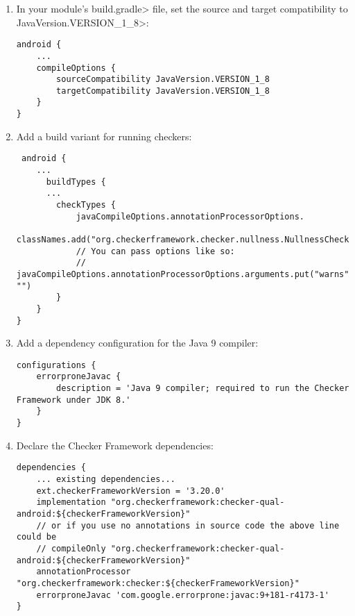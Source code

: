 \begin{enumerate}

\item In your module's \<build.gradle> file, set the source and target
  compatibility to \<JavaVersion.VERSION\_1\_8>:

\begin{Verbatim}
android {
    ...
    compileOptions {
        sourceCompatibility JavaVersion.VERSION_1_8
        targetCompatibility JavaVersion.VERSION_1_8
    }
}
\end{Verbatim}

\item Add a build variant for running checkers:

 \begin{Verbatim}
 android {
    ...
      buildTypes {
      ...
        checkTypes {
            javaCompileOptions.annotationProcessorOptions.
                    classNames.add("org.checkerframework.checker.nullness.NullnessChecker")
            // You can pass options like so:
            // javaCompileOptions.annotationProcessorOptions.arguments.put("warns", "")
        }
    }
}
\end{Verbatim}

\item Add a dependency configuration for the Java 9 compiler:

\begin{mysmall}
\begin{Verbatim}
configurations {
    errorproneJavac {
        description = 'Java 9 compiler; required to run the Checker Framework under JDK 8.'
    }
}

\end{Verbatim}
\end{mysmall}

\item Declare the Checker Framework dependencies:

\begin{mysmall}
\begin{Verbatim}
dependencies {
    ... existing dependencies...
    ext.checkerFrameworkVersion = '3.20.0'
    implementation "org.checkerframework:checker-qual-android:${checkerFrameworkVersion}"
    // or if you use no annotations in source code the above line could be
    // compileOnly "org.checkerframework:checker-qual-android:${checkerFrameworkVersion}"
    annotationProcessor "org.checkerframework:checker:${checkerFrameworkVersion}"
    errorproneJavac 'com.google.errorprone:javac:9+181-r4173-1'
}
\end{Verbatim}
\end{mysmall}


\end{enumerate}
